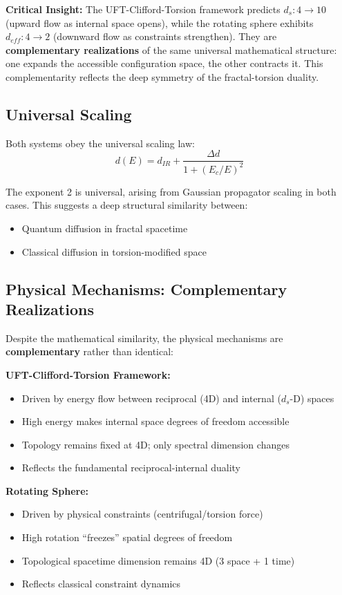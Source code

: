 \documentclass[UTF8]{ctex}\n\documentclass[12pt,a4paper]{article}
\begin{document}
\textbf{Critical Insight:} The UFT-Clifford-Torsion framework predicts $d_s: 4 \to 10$ (upward flow as internal space opens), while the rotating sphere exhibits $d_{eff}: 4 \to 2$ (downward flow as constraints strengthen). They are \textbf{complementary realizations} of the same universal mathematical structure: one expands the accessible configuration space, the other contracts it. This complementarity reflects the deep symmetry of the fractal-torsion duality.

\subsection{Universal Scaling}

Both systems obey the universal scaling law:
\begin{equation}
    d(E) = d_{IR} + \frac{\Delta d}{1+(E_c/E)^2}
\end{equation}

The exponent 2 is universal, arising from Gaussian propagator scaling in both cases. This suggests a deep structural similarity between:
\begin{itemize}
    \item Quantum diffusion in fractal spacetime
    \item Classical diffusion in torsion-modified space
\end{itemize}

\subsection{Physical Mechanisms: Complementary Realizations}

Despite the mathematical similarity, the physical mechanisms are \textbf{complementary} rather than identical:

\textbf{UFT-Clifford-Torsion Framework:}
\begin{itemize}
    \item Driven by energy flow between reciprocal (4D) and internal ($d_s$-D) spaces
    \item High energy makes internal space degrees of freedom accessible
    \item Topology remains fixed at 4D; only spectral dimension changes
    \item Reflects the fundamental reciprocal-internal duality
\end{itemize}

\textbf{Rotating Sphere:}
\begin{itemize}
    \item Driven by physical constraints (centrifugal/torsion force)
    \item High rotation ``freezes'' spatial degrees of freedom
    \item Topological spacetime dimension remains 4D (3 space + 1 time)
    \item Reflects classical constraint dynamics
\end{itemize}
\end{document}
